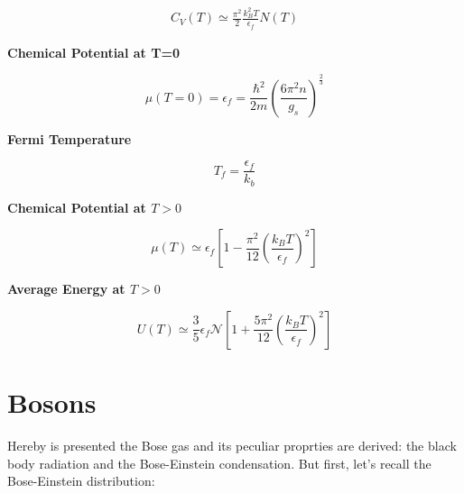 \documentclass{article}
\begin{document}
\begin{tcolorbox}[colframe=gray!50, colback=gray!10, coltitle=black, title=$C_V(T>0)$]
    \begin{equation}
        \begin{aligned}
            C_V(T)\simeq \frac{\pi^2}{2}\frac{k_B^2T}{\epsilon_f}N(T)
        \end{aligned}
    \end{equation}
\end{tcolorbox}

\newpage

\newpage
\begin{tcolorbox}[colframe=gray!90, colback=gray!5, coltitle=white, sharp corners, title=\textbf{Fermions, Summary}, fonttitle=\large\bfseries]
    \textbf{Chemical Potential at T=0}

    \begin{equation}
        \mu(T=0)=\epsilon_f=\frac{\hbar^2}{2m}\left(\frac{6\pi^2n}{g_s}\right)^{\frac{2}{3}}
    \end{equation}

    \textbf{Fermi Temperature}

    \begin{equation}
        T_f=\frac{\epsilon_f}{k_b}
    \end{equation}

    \textbf{Chemical Potential at $T>0$}

    \begin{equation}
        \mu(T)\simeq \epsilon_f\left[1-\frac{\pi^2}{12}\left(\frac{k_BT}{\epsilon_f}\right)^2\right]
    \end{equation}

    \textbf{Average Energy at $T>0$}

    \begin{equation}
        U(T)\simeq \frac{3}{5}\epsilon_f\mathcal{N}\left[1+\frac{5\pi^2}{12}\left(\frac{k_BT}{\epsilon_f}\right)^2\right]
    \end{equation}


\end{tcolorbox}
\newpage

\section{Bosons}

Hereby is presented the Bose gas and its peculiar proprties are derived:
the black body radiation and the Bose-Einstein condensation.
But first, let's recall the Bose-Einstein distribution:
\end{document}
